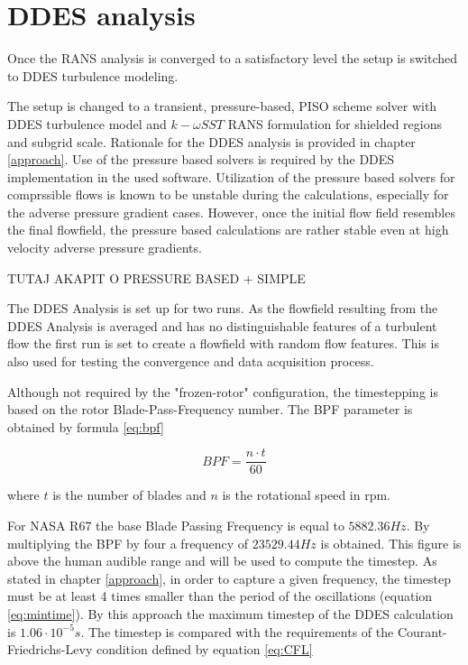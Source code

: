 \section{DDES analysis}
Once the RANS analysis is converged to a satisfactory level the setup is switched to DDES turbulence modeling.

The setup is changed to a transient, pressure-based, PISO scheme solver with DDES turbulence model and $k-\omega SST$ RANS formulation for shielded regions and subgrid scale. Rationale for the DDES analysis is provided in chapter \ref{approach}. Use of the pressure based solvers is required by the DDES implementation in the used software. Utilization of the pressure based solvers for comprssible flows is known to be unstable during the calculations, especially for the adverse pressure gradient cases. However, once the initial flow field resembles the final flowfield, the pressure based calculations are rather stable even at high velocity adverse pressure gradients.

TUTAJ AKAPIT O PRESSURE BASED + SIMPLE

The DDES Analysis is set up for two runs. As the flowfield resulting from the DDES Analysis is averaged and has no distinguishable features of a turbulent flow the first run is set to create a flowfield with random flow features. This is also used for testing the convergence and data acquisition process.

Although not required by the "frozen-rotor" configuration, the timestepping is based on the rotor Blade-Pass-Frequency number. The BPF parameter is obtained by formula \ref{eq:bpf}

\begin{equation} \label{eq:bpf}
BPF = \frac{n \cdot t}{60}
\end{equation}

\noindent where $t$ is the number of blades and $n$ is the rotational speed in rpm.

For NASA R67 the base Blade Passing Frequency is equal to $5882.36 Hz$. By multiplying the BPF by four a frequency of $23529.44 Hz$ is obtained. This figure is above the human audible range and will be used to compute the timestep. As stated in chapter \ref{approach}, in order to capture a given frequency, the timestep must be at least 4 times smaller than the period of the oscillations (equation \ref{eq:mintime}). By this approach the maximum timestep of the DDES calculation is $1.06 \cdot 10^{-5}s$. The timestep is compared with the requirements of the Courant-Friedrichs-Levy condition defined by equation \ref{eq:CFL}

